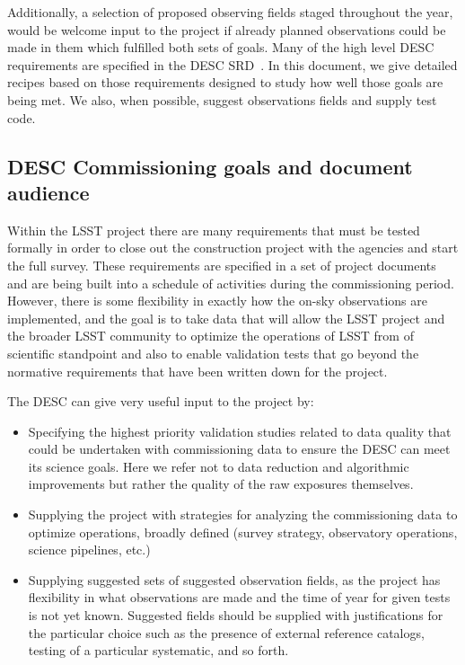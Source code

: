 \documentclass[modern]{desc-tex/styles/lsstdescnote}
\begin{document}
Additionally, a selection of proposed observing fields staged throughout the year, would be welcome input to the project if already planned observations could be made in them which fulfilled both sets of goals.  Many of the high level DESC requirements are specified in the DESC SRD~\cite{DESC-SRD}.  In this document, we  give detailed recipes based on those requirements designed to study how well those goals are being met. We also, when possible, suggest observations fields and supply test code.

\subsection{DESC Commissioning goals and document audience}

Within the LSST project there are many requirements that must be tested formally in order to close out the construction project with the agencies and start the full survey. These requirements are specified in a set of project documents and are being built into a schedule of activities during the commissioning period. However, there is some flexibility in exactly how the on-sky observations are implemented, and the goal is to take data that will allow the LSST project and  the broader LSST community to optimize the operations of LSST from of scientific standpoint and also to enable validation tests that go beyond the normative requirements that have been written down for the project.

The DESC can give very useful input to the project by:

\begin{itemize}

\item  Specifying the highest priority validation studies related to data quality that could be undertaken with commissioning data to ensure the DESC can meet its science goals.  Here we refer not to data reduction and algorithmic improvements but rather the quality of the raw exposures themselves.

\item Supplying the project with strategies for analyzing the commissioning data to optimize operations, broadly defined (survey strategy, observatory operations, science pipelines, etc.)

\item Supplying suggested sets of suggested observation fields, as the project has flexibility in what observations are made and the time of year for given tests is not yet known.  Suggested fields should be supplied with justifications for the particular choice such as the presence of external reference catalogs, testing of a particular systematic, and so forth.
  
\end{itemize}
\end{document}
